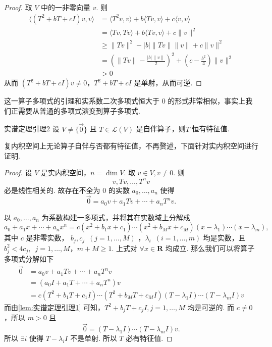 \begin{proof}
    取 $ V $ 中的一非零向量 $ v $. 则
    \begin{align*}
        \langle(T^2+bT+cI)v,v\rangle & = \langle T^2v,v \rangle + b\langle Tv,v \rangle + c\langle v,v \rangle                                  \\
                                     & = \langle Tv,Tv \rangle + b\langle Tv,v \rangle + c\lVert v \rVert^2                                     \\
                                     & \geqslant \lVert Tv \rVert^2 - \lvert b \rvert \lVert Tv \rVert \lVert v \rVert +  c\lVert v \rVert^2    \\
                                     & = \left(\lVert Tv \rVert - \frac{|b| \lVert v \rVert}{2}\right)^2 + (c - \frac{b^2}{4})\lVert v \rVert^2 \\
                                     & > 0
    \end{align*}
    从而 $ (T^2 + bT + cI)v \neq 0 $，$ T^2 + bT + cI $ 是单射，从而可逆.
\end{proof}

这一算子多项式的引理和实系数二次多项式恒大于 0 的形式非常相似，事实上我们正需要从普通的多项式演变到算子多项式.

\begin{lemma}{}{实谱定理引理2}
    设 $ V \neq \{ \vec{0} \} $ 且 $ T \in \mathcal{L}(V) $ 是自伴算子，则$ T $ 恒有特征值.
\end{lemma}

复内积空间上无论算子自伴与否都有特征值，不再赘述，下面针对实内积空间进行证明.

\begin{proof}
    设 $ V $ 是实内积空间，$ n = \dim V $. 取 $ v \in V, v \neq 0 $. 则
    \[ v, Tv, \ldots , T^nv \]
    必是线性相关的. 故存在不全为 0 的实数 $ a_0, \ldots , a_n $ 使得
    \[ \vec{0} = a_0v + a_1Tv + \cdots + a_nT^nv. \]

    以 $ a_0, \ldots , a_n $ 为系数构建一多项式，并将其在实数域上分解成
    \[ a_0 + a_1x + \cdots + a_nx^n  = c(x^2 + b_1x + c_1)\cdots(x^2 + b_Mx + c_M)(x - \lambda_1)\cdots(x - \lambda_m), \]
    其中 $ c $ 是非零实数， $ b_j, c_j \enspace(j = 1, \ldots , M) $ ，$ \lambda_i \enspace(i = 1, \ldots , m) $ 均是实数，且 $ b_j^2 < 4c_j ,\enspace j = 1, \ldots , M $，$ m + M \geqslant 1 $. 上式对 $ \forall x \in \mathbf{R} $ 均成立. 那么我们可以将算子多项式分解如下
    \begin{align*}
        \vec{0} & = a_0v + a_1Tv + \cdots + a_nT^nv                                                      \\
                & = (a_0I + a_1T + \cdots + a_nT^n)v                                                     \\
                & = c(T^2 + b_1T + c_1I)\cdots(T^2 + b_MT + c_MI)(T - \lambda_1I)\cdots(T - \lambda_mI)v
    \end{align*}
    而由\autoref{lem:实谱定理引理1} 可知，$ T^2 + b_jT + c_jI, j = 1, \ldots , M $ 均是可逆的. 而 $ c \neq 0 $，所以 $ m > 0 $ 且
    \[ \vec{0} = (T - \lambda_1I)\cdots(T - \lambda_mI)v. \]
    所以 $ \exists i $ 使得 $ T - \lambda_iI $ 不是单射. 所以 $ T $ 必有特征值.
\end{proof}

